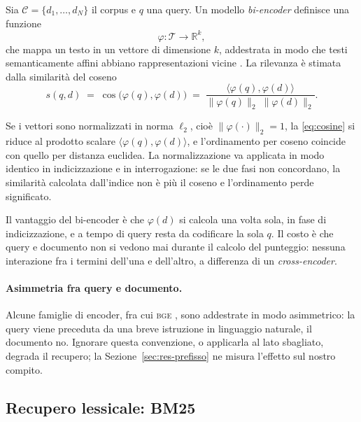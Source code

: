 \documentclass[pdflatex,sn-mathphys-num]{sn-jnl}
\theoremstyle{thmstyleone}
\theoremstyle{thmstyletwo}
\theoremstyle{thmstylethree}
\begin{document}
Sia $\mathcal{C} = \{d_1, \dots, d_N\}$ il corpus e $q$ una query. Un modello \emph{bi-encoder} definisce una funzione
\begin{equation}
  \varphi : \mathcal{T} \longrightarrow \mathbb{R}^{k},
  \label{eq:encoder}
\end{equation}
che mappa un testo in un vettore di dimensione $k$, addestrata in modo che testi semanticamente affini abbiano rappresentazioni vicine \cite{reimers2019sbert,karpukhin2020dpr}. La rilevanza è stimata dalla similarità del coseno
\begin{equation}
  s(q,d) \;=\; \cos\big(\varphi(q), \varphi(d)\big) \;=\; \frac{\langle \varphi(q), \varphi(d)\rangle}{\lVert \varphi(q)\rVert_2 \; \lVert \varphi(d)\rVert_2}.
  \label{eq:cosine}
\end{equation}

Se i vettori sono normalizzati in norma $\ell_2$, cioè $\lVert \varphi(\cdot)\rVert_2 = 1$, la \eqref{eq:cosine} si riduce al prodotto scalare $\langle \varphi(q), \varphi(d)\rangle$, e l'ordinamento per coseno coincide con quello per distanza euclidea. La normalizzazione va applicata in modo identico in indicizzazione e in interrogazione: se le due fasi non concordano, la similarità calcolata dall'indice non è più il coseno e l'ordinamento perde significato.

Il vantaggio del bi-encoder è che $\varphi(d)$ si calcola una volta sola, in fase di indicizzazione, e a tempo di query resta da codificare la sola $q$. Il costo è che query e documento non si vedono mai durante il calcolo del punteggio: nessuna interazione fra i termini dell'una e dell'altro, a differenza di un \emph{cross-encoder}.

\paragraph{Asimmetria fra query e documento.} Alcune famiglie di encoder, fra cui \textsc{bge} \cite{xiao2024cpack}, sono addestrate in modo asimmetrico: la query viene preceduta da una breve istruzione in linguaggio naturale, il documento no. Ignorare questa convenzione, o applicarla al lato sbagliato, degrada il recupero; la Sezione~\ref{sec:res-prefisso} ne misura l'effetto sul nostro compito.

\subsection{Recupero lessicale: BM25}\label{sec:bm25}
\end{document}
